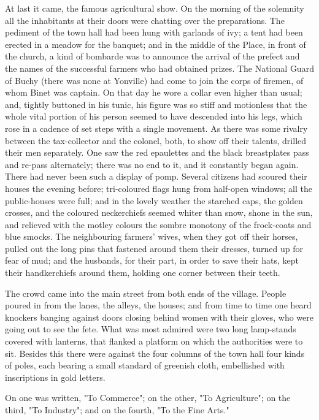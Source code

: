 \documentclass[11pt,twocolumn]{ltugboat}
\begin{document}
At last it came, the famous agricultural show. On the morning of the
solemnity all the inhabitants at their doors were chatting over the
preparations. The pediment of the town hall had been hung with garlands
of ivy; a tent had been erected in a meadow for the banquet; and in the
middle of the Place, in front of the church, a kind of bombarde was
to announce the arrival of the prefect and the names of the successful
farmers who had obtained prizes. The National Guard of Buchy (there was
none at Yonville) had come to join the corps of firemen, of whom Binet
was captain. On that day he wore a collar even higher than usual; and,
tightly buttoned in his tunic, his figure was so stiff and motionless
that the whole vital portion of his person seemed to have descended into
his legs, which rose in a cadence of set steps with a single movement.
As there was some rivalry between the tax-collector and the colonel,
both, to show off their talents, drilled their men separately. One
saw the red epaulettes and the black breastplates pass and re-pass
alternately; there was no end to it, and it constantly began again.
There had never been such a display of pomp. Several citizens had
scoured their houses the evening before; tri-coloured flags hung from
half-open windows; all the public-houses were full; and in the lovely
weather the starched caps, the golden crosses, and the coloured
neckerchiefs seemed whiter than snow, shone in the sun, and relieved
with the motley colours the sombre monotony of the frock-coats and blue
smocks. The neighbouring farmers' wives, when they got off their horses,
pulled out the long pins that fastened around them their dresses, turned
up for fear of mud; and the husbands, for their part, in order to save
their hats, kept their handkerchiefs around them, holding one corner
between their teeth.

The crowd came into the main street from both ends of the village.
People poured in from the lanes, the alleys, the houses; and from time
to time one heard knockers banging against doors closing behind women
with their gloves, who were going out to see the fete. What was most
admired were two long lamp-stands covered with lanterns, that flanked a
platform on which the authorities were to sit. Besides this there were
against the four columns of the town hall four kinds of poles,
each bearing a small standard of greenish cloth, embellished with
inscriptions in gold letters.

On one was written, "To Commerce"; on the other, "To Agriculture"; on
the third, "To Industry"; and on the fourth, "To the Fine Arts."
\end{document}
